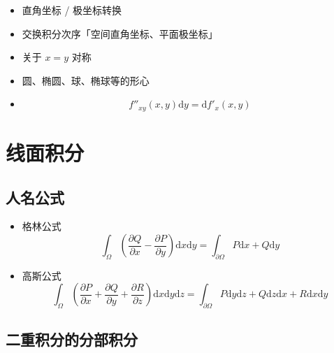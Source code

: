 \documentclass{article}
\begin{document}
\begin{itemize}
    \item 直角坐标 / 极坐标转换
    \item 交换积分次序「空间直角坐标、平面极坐标」
    \item 关于 $x = y$ 对称
    \item 圆、椭圆、球、椭球等的形心
    \item \begin{equation}
              f''_{xy}(x, y) \mathrm{d} y = \mathrm{d} f'_x(x, y)
          \end{equation}
\end{itemize}

\section{线面积分}

\subsection{人名公式}

\begin{itemize}
    \item 格林公式 \begin{equation}
              \int_\Omega \left(\frac{\partial Q}{\partial x} - \frac{\partial P}{\partial y}\right) \mathrm{d}x \mathrm{d}y = \int_{\partial \Omega} P \mathrm{d}x + Q \mathrm{d}y
          \end{equation}
    \item 高斯公式 \begin{equation}
              \int_\Omega \left(\frac{\partial P}{\partial x} + \frac{\partial Q}{\partial y} + \frac{\partial R}{\partial z}\right) \mathrm{d}x \mathrm{d}y \mathrm{d}z = \int_{\partial \Omega} P \mathrm{d}y \mathrm{d}z + Q \mathrm{d}z \mathrm{d}x + R \mathrm{d}x \mathrm{d}y
          \end{equation}
\end{itemize}

\subsection{二重积分的分部积分}
\end{document}
